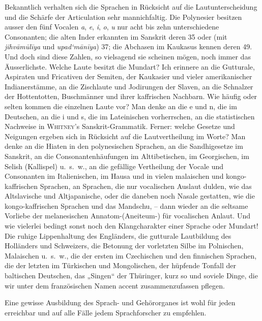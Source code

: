 Bekanntlich verhalten sich die Sprachen in Rücksicht auf die Lautunterscheidung und die Schärfe der Articulation sehr mannichfaltig. Die Polynesier besitzen ausser den fünf Vocalen \textit{a}, \textit{e}, \textit{i}, \textit{o}, \textit{u} nur acht bis zehn unterschiedene Consonanten; die alten Inder erkannten im Sanskrit deren 35 oder (mit \textit{jihvāmūlīya} und \textit{upad‘mānīya}) 37; die Abchasen im Kaukasus kennen deren 49. Und doch sind diese Zahlen, so vielsagend sie scheinen mögen, noch immer das Äusserlichste. Welche Laute besitzt die Mundart? Ich erinnere an die Gutturale, Aspiraten und Fricativen der Semiten, der Kaukasier und vieler amerikanischer Indianerstämme, an die Zischlaute und Jodirungen der Slaven, an die Schnalzer der Hottentotten, Buschmänner und ihrer kaffrischen Nachbarn. Wie häufig oder selten kommen die einzelnen Laute vor? Man denke an die e und n, die im Deutschen, an die i und s, die im Lateinischen vorherrschen, an die statistischen Nachweise in \textsc{Whitney}’s Sanskrit-Grammatik. Ferner: welche Gesetze und Neigungen ergeben sich in Rücksicht auf die Lautvertheilung im Worte? Man denke an die Hiaten in den polynesischen Sprachen, an die Sandhigesetze im Sanskrit, an die Consonantenhäufungen im Alttibetischen, im Georgischen, im Selish (Kallispel) u.~s.~w., an die gefällige Vertheilung der Vocale und Consonanten im Italienischen, im Hausa und in vielen malaischen und kongo-kaffrischen Sprachen, an Sprachen, die nur vocalischen Auslaut dulden, wie das Altslavische und Altjapanische, oder die daneben noch Nasale gestatten, wie die kongo-kaffrischen Sprachen und das Mandschu, – dann wieder an die seltsame Vorliebe der melanesischen Annatom-(Aneiteum-)  für \label{sp.35} vocalischen Anlaut. Und wie vielerlei bedingt sonst noch den Klangcharakter einer Sprache oder Mundart! Die ruhige Lippenhaltung des Engländers, die gutturale Lautbildung des Holländers und Schweizers, die Betonung der vorletzten Silbe im Polnischen, Malaischen u.~s.~w., die der ersten im Czechischen und den finnischen Sprachen, die der letzten im Türkischen und Mongolischen, der hüpfende Tonfall der baltischen Deutschen, das „Singen“ der Thüringer, kurz so und soviele Dinge, die wir unter dem französischen Namen accent zusammenzufassen pflegen.

\label{fp.35}

Eine gewisse Ausbildung des Sprach- und Gehörorganes ist wohl für jeden erreichbar und auf alle Fälle jedem Sprachforscher zu empfehlen.

